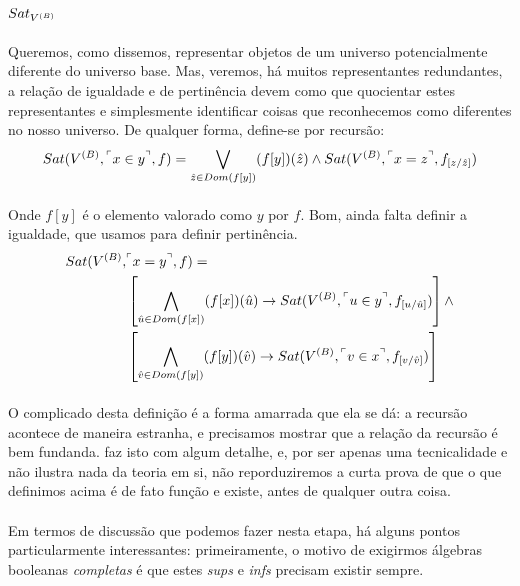 \begin{definition}{$Sat_{V^{(B)}}$}
        \paragraph{}
            Queremos, como dissemos, representar objetos de um 
            universo potencialmente diferente do universo base. 
            Mas, veremos, há muitos representantes redundantes,
            a relação de igualdade e de pertinência devem como 
            que quocientar estes representantes e simplesmente 
            identificar coisas que reconhecemos como diferentes
            no nosso universo. De qualquer forma, define-se por
            recursão:
        $$ Sat(\V{B}, \FMLA{x\in y}, f) = \bigvee_{\hat z\in Dom(f[y])} (f[y])(\hat z)\land Sat(\V{B}, \FMLA{x = z}, f_{[z\slash\hat z]} )$$
        \paragraph{}
            Onde $f[y]$ é o elemento valorado como $y$ por $f$. 
            Bom, ainda falta definir a igualdade, que usamos 
            para definir pertinência.
        \begin{align*}
            Sat(\V{B}, &\FMLA{x = y}, f) = \\
                &\left[\bigwedge_{\hat u \in Dom(f[x])} (f[x])(\hat u) \rar Sat(\V{B}, \FMLA{u \in y}, f_{[u\slash\hat u]}) \right] \land \\
                &\left[\bigwedge_{\hat v \in Dom(f[y])} (f[y])(\hat v) \rar Sat(\V{B}, \FMLA{v \in x}, f_{[v\slash\hat v]}) \right]
        \end{align*}
    \end{definition}
    \paragraph{}
        O complicado desta definição é a forma amarrada que 
        ela se dá: a recursão acontece de maneira estranha,
        e precisamos mostrar que a relação da recursão é bem
        fundanda. \cite{Bell} faz isto com algum detalhe, e,
        por ser apenas uma tecnicalidade e não ilustra nada 
        da teoria em si, não reporduziremos a curta prova de
        que o que definimos acima é de fato função e existe,
        antes de qualquer outra coisa.
    \paragraph{}
        Em termos de discussão que podemos fazer nesta etapa,
        há alguns pontos particularmente interessantes: 
        primeiramente, o motivo de exigirmos álgebras booleanas
        \textit{completas} é que estes \textit{sups} e 
        \textit{infs} precisam existir sempre.
